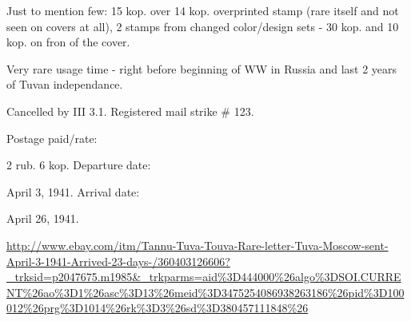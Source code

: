 Just to mention few: 15 kop. over 14 kop. overprinted stamp (rare itself and not seen on covers at all), 2 stamps from changed color/design sets - 30 kop. and 10 kop. on fron of the cover.

Very rare usage time - right before beginning of WW in Russia and last 2 years of Tuvan independance.

Cancelled by III 3.1.
Registered mail strike \# 123.

Postage paid/rate:

2 rub. 6 kop.
Departure date:

April 3, 1941.
Arrival date:

April 26, 1941.

\url{http://www.ebay.com/itm/Tannu-Tuva-Touva-Rare-letter-Tuva-Moscow-sent-April-3-1941-Arrived-23-days-/360403126606?_trksid=p2047675.m1985&_trkparms=aid%3D444000%26algo%3DSOI.CURRENT%26ao%3D1%26asc%3D13%26meid%3D3475254086938263186%26pid%3D100012%26prg%3D1014%26rk%3D3%26sd%3D380457111848%26}






                                                      